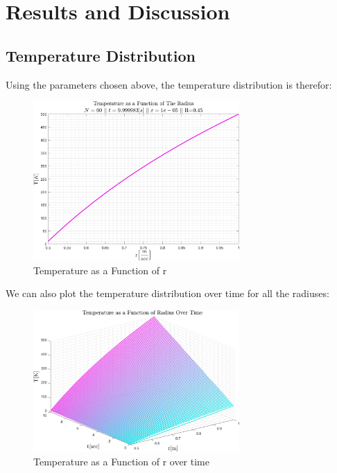 \documentclass[11pt, a4paper]{article}
\begin{document}
\newpage
\section{Results and Discussion}
\label{sec: results and discussion}
\subsection{Temperature Distribution}
Using the parameters chosen above, the temperature distribution is therefor:
\begin{figure}[H]
    \centering
    \includegraphics[width=0.7\textwidth]{images/T over r.png}
    \caption{Temperature as a Function of r}
    \label{fig: T vs r}
\end{figure}
We can also plot the temperature distribution over time for all the radiuses:
\begin{figure}[H]
    \centering
    \includegraphics[width=0.7\textwidth]{images/T vs r vs t.png}
    \caption{Temperature as a Function of r over time}
    \label{fig: T vs r vs t}
\end{figure}

\newpage
\end{document}
